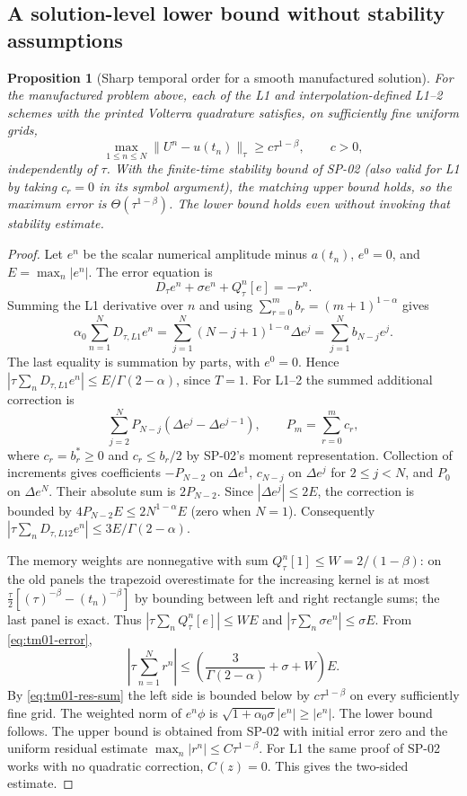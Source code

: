 \documentclass[11pt,a4paper]{amsart}
\theoremstyle{remark}
\theoremstyle{plain}
\newtheorem{proposition}{Proposition}[section]
\theoremstyle{remark}
\numberwithin{equation}{section}
\begin{document}
\subsection{A solution-level lower bound without stability assumptions}
\begin{proposition}[Sharp temporal order for a smooth manufactured solution]\label{prop:tm01-sharp}
For the manufactured problem above, each of the L1 and interpolation-defined L1--2 schemes with the printed Volterra quadrature satisfies, on sufficiently fine uniform grids,
\[
 \max_{1\le n\le N}\|U^n-u(t_n)\|_\tau\ge c\tau^{1-\beta},\qquad c>0,
\]
independently of $\tau$. With the finite-time stability bound of SP-02 (also valid for L1 by taking $c_r=0$ in its symbol argument), the matching upper bound holds, so the maximum error is $\Theta(\tau^{1-\beta})$. The lower bound holds even without invoking that stability estimate.
\end{proposition}
\begin{proof}
Let $e^n$ be the scalar numerical amplitude minus $a(t_n)$, $e^0=0$, and $E=\max_n|e^n|$. The error equation is
\begin{equation}\label{eq:tm01-error}
 D_\tau e^n+\sigma e^n+Q_\tau^n[e]=-r^n.
\end{equation}
Summing the L1 derivative over $n$ and using $\sum_{r=0}^{m}b_r=(m+1)^{1-\alpha}$ gives
\[
 \alpha_0\sum_{n=1}^N D_{\tau,L1}e^n
 =\sum_{j=1}^N(N-j+1)^{1-\alpha}\Delta e^j
 =\sum_{j=1}^N b_{N-j}e^j.
\]
The last equality is summation by parts, with $e^0=0$. Hence $|\tau\sum_n D_{\tau,L1}e^n|\le E/\Gamma(2-\alpha)$, since $T=1$.
For L1--2 the summed additional correction is
\[
 \sum_{j=2}^N P_{N-j}(\Delta e^j-\Delta e^{j-1}),\qquad P_m=\sum_{r=0}^m c_r,
\]
where $c_r=b_r^*\ge0$ and $c_r\le b_r/2$ by SP-02's moment representation. Collection of increments gives coefficients $-P_{N-2}$ on $\Delta e^1$, $c_{N-j}$ on $\Delta e^j$ for $2\le j<N$, and $P_0$ on $\Delta e^N$. Their absolute sum is $2P_{N-2}$. Since $|\Delta e^j|\le2E$, the correction is bounded by $4P_{N-2}E\le2N^{1-\alpha}E$ (zero when $N=1$). Consequently $|\tau\sum_n D_{\tau,L12}e^n|\le3E/\Gamma(2-\alpha)$.

The memory weights are nonnegative with sum $Q_\tau^n[1]\le W=2/(1-\beta)$: on the old panels the trapezoid overestimate for the increasing kernel is at most $\frac{\tau}{2}[(\tau)^{-\beta}-(t_n)^{-\beta}]$ by bounding between left and right rectangle sums; the last panel is exact. Thus $|\tau\sum_n Q_\tau^n[e]|\le WE$ and $|\tau\sum_n\sigma e^n|\le\sigma E$. From \eqref{eq:tm01-error},
\[
 \left|\tau\sum_{n=1}^N r^n\right|\le
 \left(\frac{3}{\Gamma(2-\alpha)}+\sigma+W\right)E.
\]
By \eqref{eq:tm01-res-sum} the left side is bounded below by $c\tau^{1-\beta}$ on every sufficiently fine grid. The weighted norm of $e^n\phi$ is $\sqrt{1+\alpha_0\sigma}|e^n|\ge|e^n|$. The lower bound follows. The upper bound is obtained from SP-02 with initial error zero and the uniform residual estimate $\max_n|r^n|\le C\tau^{1-\beta}$. For L1 the same proof of SP-02 works with no quadratic correction, $C(z)=0$. This gives the two-sided estimate.
\end{proof}
\end{document}
